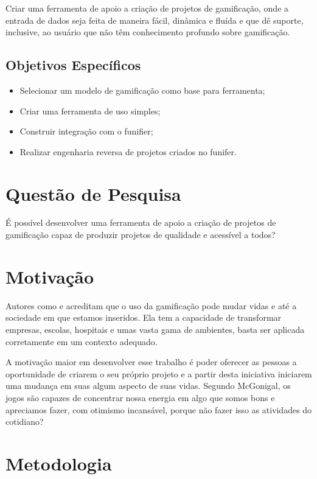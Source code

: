Criar uma ferramenta de apoio a criação de projetos de gamificação, onde a entrada de dados seja feita de maneira fácil, dinâmica e fluída e que dê suporte, inclusive, ao usuário que não têm conhecimento profundo sobre gamificação.

\subsection{Objetivos Específicos}

\begin{itemize}

\item  Selecionar um modelo de gamificação como base para ferramenta;
\item  Criar uma ferramenta de uso simples;
\item  Construir integração com o funifier;
\item  Realizar engenharia reversa de projetos criados no funifer.


\end{itemize}

\section{Questão de Pesquisa}

É possível desenvolver uma ferramenta de apoio a criação de projetos de gamificação capaz de produzir projetos de qualidade e acessível a todos?


\section{Motivação}

 Autores como \cite{chou2015actionable} e \cite{mcgonigal2011reality} acreditam que o uso da gamificação pode mudar vidas e até a sociedade em que estamos inseridos. Ela tem a capacidade de transformar empresas, escolas, hospitais e umas vasta gama de ambientes, basta ser aplicada corretamente em um contexto adequado. 

 A motivação maior em desenvolver esse trabalho é poder oferecer as pessoas a oportunidade de criarem o seu próprio projeto e a partir desta iniciativa iniciarem uma mudança em suas algum aspecto de suas vidas. Segundo McGonigal, os jogos são capazes de concentrar nossa energia em algo que somos bons e apreciamos fazer, com otimismo incansável, porque não fazer isso as atividades do cotidiano?


\section{Metodologia}

